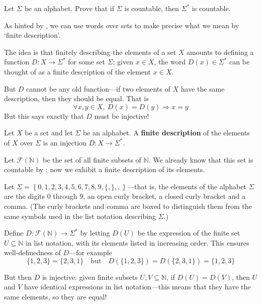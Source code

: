 \begin{exercise}
Let $\Sigma$ be an alphabet. Prove that if $\Sigma$ is countable, then $\Sigma^*$ is countable.
\end{exercise}

As hinted by , we can use words over sets to make precise what we mean by `finite description'.

The idea is that finitely describing the elements of a set $X$ amounts to defining a function $D : X \to \Sigma^*$ for some set $\Sigma$; given $x \in X$, the word $D(x) \in \Sigma^*$ can be thought of as a finite description of the element $x \in X$.

But $D$ cannot be any old function---if two elements of $X$ have the same description, then they should be equal. That is
\[ \forall x,y \in X,~ D(x) = D(y) \Rightarrow x=y \]
But this says exactly that $D$ must be injective!

\begin{definition}
\label{defFiniteDescription}
Let $X$ be a set and let $\Sigma$ be an alphabet. A \textbf{finite description} of the elements of $X$ over $\Sigma$ is an injection $D : X \to \Sigma^*$.
\end{definition}

\begin{example}
\label{exFiniteDescriptionOfFiniteSubsetsOfN}
Let $\mathcal{F}(\mathbb{N})$ be the set of all finite subsets of $\mathbb{N}$. We already know that this set is countable by ; now we exhibit a finite description of its elements.

Let $\Sigma = \left\{ 0,1,2,3,4,5,6,7,8,9,\boxed{\{},\boxed{\}},\boxed{,} \right\}$---that is, the elements of the alphabet $\Sigma$ are the digits $0$ through $9$, an open curly bracket, a closed curly bracket and a comma. (The curly brackets and comma are boxed to distinguish them from the same symbols used in the list notation describing $\Sigma$.)

Define $D : \mathcal{F}(\mathbb{N}) \to \Sigma^*$ by letting $D(U)$ be the expression of the finite set $U \subseteq \mathbb{N}$ in list notation, with its elements listed in increasing order. This ensures well-definedness of $D$---for example
\[ \{1,2,3\} = \{2,3,1\} \quad \text{but} \quad D(\{1,2,3\}) = D(\{2,3,1\}) = \{1,2,3\} \] 

But then $D$ is injective: given finite subsets $U, V \subseteq \mathbb{N}$, if $D(U) = D(V)$, then $U$ and $V$ have identical expressions in list notation---this means that they have the same elements, so they are equal!
\end{example}

